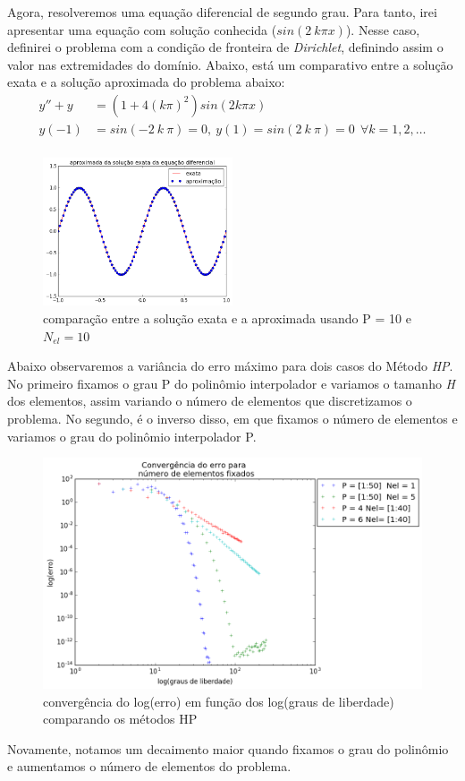  Agora, resolveremos uma equação diferencial de segundo grau. Para tanto, irei apresentar uma equação com solução conhecida ($sin(2\ k \pi x)$). Nesse caso, definirei o problema com a condição de fronteira de \emph{Dirichlet}, definindo assim o valor nas extremidades do domínio. Abaixo, está um comparativo entre a solução exata e a solução aproximada do problema abaixo:
\begin{align}
y'' + y &= (1 + 4 (k \pi)^2)sin(2 k \pi x) \\
y(-1) &= sin(-2\ k \ \pi ) = 0 ,\ y(1) = sin(2\ k\ \pi) = 0 \ \ \forall k = 1,2,\dots \\
\end{align}	
\begin{figure}[H]
\centering
\includegraphics[width=0.5\textwidth,center]{figuras/solu_edo_simul.png}
\caption{comparação entre a solução exata e a aproximada usando P = 10 e $N_{el} = 10$ } 
\end{figure}
 Abaixo observaremos a variância do erro máximo para dois casos do Método \emph{HP}. No primeiro fixamos o grau P do polinômio interpolador e variamos o tamanho \emph{H} dos elementos, assim variando o número de elementos que discretizamos o problema. No segundo, é o inverso disso, em que fixamos o número de elementos e variamos o grau do polinômio interpolador P.
\begin{figure}[H]
  \includegraphics[width=.7 \textwidth,center]{figuras/convergencia_erro_HP.png}
  \caption{convergência do log(erro) em função dos log(graus de liberdade) comparando os métodos HP }
\end{figure}
 Novamente, notamos um decaimento maior quando fixamos o grau do polinômio e aumentamos o número de elementos do problema.
